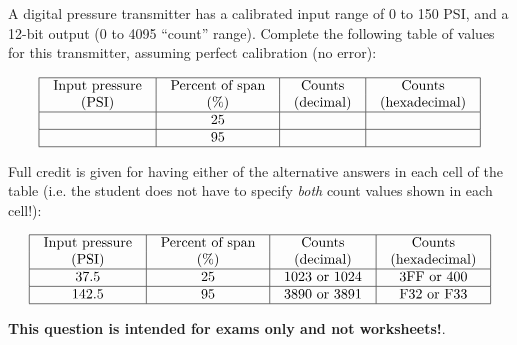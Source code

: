 

A digital pressure transmitter has a calibrated input range of 0 to 150 PSI, and a 12-bit output (0 to 4095 ``count'' range).  Complete the following table of values for this transmitter, assuming perfect calibration (no error):


$$\vbox{\offinterlineskip
\halign{\strut
\vrule \quad\hfil # \ \hfil & 
\vrule \quad\hfil # \ \hfil & 
\vrule \quad\hfil # \ \hfil & 
\vrule \quad\hfil # \ \hfil \vrule \cr
\noalign{\hrule}
%
Input pressure & Percent of span & Counts & Counts \cr
%
(PSI) & (\%) & (decimal) & (hexadecimal) \cr
%
\noalign{\hrule}
%
 & 25 &  &  \cr
%
\noalign{\hrule}
%
 & 95 &  &  \cr
%
\noalign{\hrule}
} %
}$$ %







Full credit is given for having either of the alternative answers in each cell of the table (i.e. the student does not have to specify {\it both} count values shown in each cell!):


$$\vbox{\offinterlineskip
\halign{\strut
\vrule \quad\hfil # \ \hfil & 
\vrule \quad\hfil # \ \hfil & 
\vrule \quad\hfil # \ \hfil & 
\vrule \quad\hfil # \ \hfil \vrule \cr
\noalign{\hrule}
%
Input pressure & Percent of span & Counts & Counts \cr
%
(PSI) & (\%) & (decimal) & (hexadecimal) \cr
%
\noalign{\hrule}
%
37.5 & 25 & 1023 or 1024 & 3FF or 400 \cr
%
\noalign{\hrule}
%
142.5 & 95 & 3890 or 3891 & F32 or F33 \cr
%
\noalign{\hrule}
} %
}$$ %








{\bf This question is intended for exams only and not worksheets!}.



